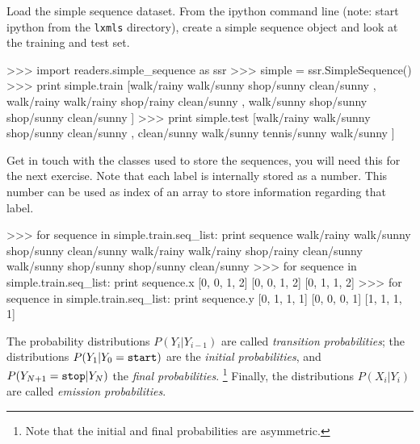 \begin{exercise}
Load the simple sequence dataset. 
From the ipython command line (note: start ipython from the {\tt lxmls}
directory), create a simple sequence object and look at the training
and test set.
\begin{python}
>>> import readers.simple_sequence as ssr
>>> simple = ssr.SimpleSequence()
>>> print simple.train
[walk/rainy walk/sunny shop/sunny clean/sunny , walk/rainy walk/rainy shop/rainy clean/sunny , walk/sunny shop/sunny shop/sunny clean/sunny ]
>>> print simple.test
[walk/rainy walk/sunny shop/sunny clean/sunny , clean/sunny walk/sunny tennis/sunny walk/sunny ]
\end{python}
Get in touch with the classes used to store the sequences, you will need this for the next exercise. Note that each label is internally stored as a number. This number can be used as index of an array to store information regarding that label.
\begin{python}
>>> for sequence in simple.train.seq_list:
	print sequence
walk/rainy walk/sunny shop/sunny clean/sunny
walk/rainy walk/rainy shop/rainy clean/sunny
walk/sunny shop/sunny shop/sunny clean/sunny
>>> for sequence in simple.train.seq_list:
	print sequence.x
[0, 0, 1, 2]
[0, 0, 1, 2]
[0, 1, 1, 2]
>>> for sequence in simple.train.seq_list:
	print sequence.y
[0, 1, 1, 1]
[0, 0, 0, 1]
[1, 1, 1, 1]
\end{python}

\end{exercise}

The probability distributions $P(Y_{i}|Y_{i-1})$ are called \emph{transition probabilities}; the distributions 
$P(Y_{1}|Y_{0} = {\tt start})$ are the \emph{initial probabilities}, and 
$P(Y_{N+1}={\tt stop} |Y_{N})$ the \emph{final probabilities}.%
\footnote{Note that the initial and final probabilities 
are asymmetric.} %
Finally, the distributions $P(X_i|Y_i)$ are called \emph{emission probabilities}. 



